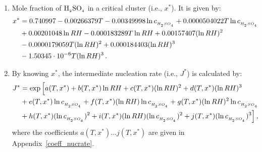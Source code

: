 \begin{enumerate}
\item Mole fraction of $\rm H_{_2}SO_{_4}$ in a critical cluster (i.e., $x^*$). It is
given by:
%
\begin{align}
x^* &= 0.740997 - 0.00266379 T - 0.00349998 \ln c_{_{H_{_2}SO_{_4}}}
           + 0.0000504022 T \ln c_{_{H_{_2}SO_{_4}}} \nonumber \\
      &+ 0.00201048 \ln RH - 0.000183289 T \ln RH
           + 0.00157407 (\ln RH)^2 \nonumber \\
      &- 0.0000179059 T (\ln RH)^2 + 0.000184403 (\ln RH)^3 \nonumber \\
      &- 1.50345 \cdot 10^{-6} T (\ln RH)^3 \,.
\end{align}
%
\item By knowing $x^*$, the intermediate nucleation rate (i.e., $J^*$) is calculated by:
%
\begin{align}
J^* &= \exp \Big[ a(T,x^*) + b(T,x^*) \ln RH +
         c(T,x^*) (\ln RH)^2 + d(T,x^*) (\ln RH)^3 \nonumber \\
    &+ e(T,x^*) \ln c_{_{H_{_2}SO_{_4}}} + f(T,x^*) (\ln RH) \ln c_{_{H_{_2}SO_{_4}}} +
         g(T,x^*) (\ln RH)^2 \ln c_{_{H_{_2}SO_{_4}}} \nonumber \\
    &+ h(T,x^*) (\ln c_{_{H_{_2}SO_{_4}}})^2 + i(T,x^*) (\ln RH)
    (\ln c_{_{H_{_2}SO_{_4}}})^2 + j(T,x^*) (\ln c_{_{H_{_2}SO_{_4}}})^3 \Big] \,, \label{vk2002_nucrate}
\end{align}
where the coefficients $a(T,x^*) \dots j(T,x^*)$ are given in Appendix~\ref{coeff_nucrate}.

\end{enumerate}
